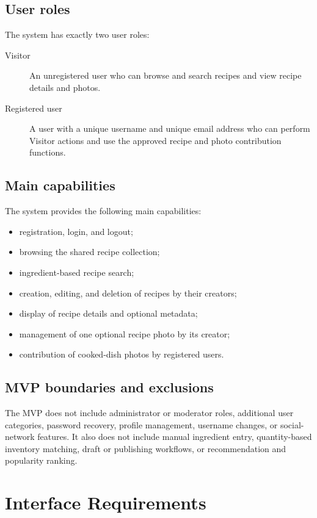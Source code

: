 \documentclass[12pt]{article}
\begin{document}
\subsection{User roles}
The system has exactly two user roles:
\begin{description}
    \item[Visitor] An unregistered user who can browse and search recipes and view recipe details and photos.
    \item[Registered user] A user with a unique username and unique email address who can perform Visitor actions and use the approved recipe and photo contribution functions.
\end{description}

\subsection{Main capabilities}
The system provides the following main capabilities:
\begin{itemize}
    \item registration, login, and logout;
    \item browsing the shared recipe collection;
    \item ingredient-based recipe search;
    \item creation, editing, and deletion of recipes by their creators;
    \item display of recipe details and optional metadata;
    \item management of one optional recipe photo by its creator;
    \item contribution of cooked-dish photos by registered users.
\end{itemize}

\subsection{MVP boundaries and exclusions}
The MVP does not include administrator or moderator roles, additional user categories, password recovery, profile management, username changes, or social-network features. It also does not include manual ingredient entry, quantity-based inventory matching, draft or publishing workflows, or recommendation and popularity ranking.

\section{Interface Requirements}
\end{document}
